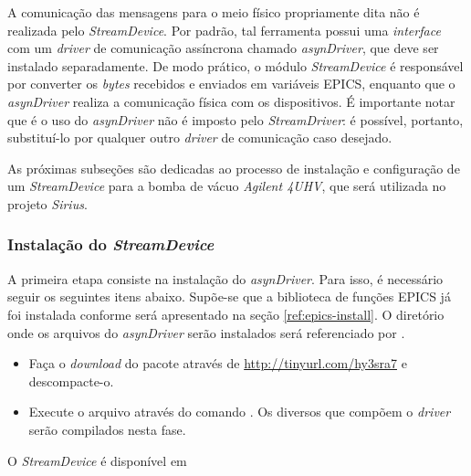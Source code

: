 \vspace{12pt}

A comunicação das mensagens para o meio físico propriamente dita não é realizada
pelo \textit{StreamDevice}. Por padrão, tal ferramenta possui uma
\textit{interface} com um \textit{driver} de comunicação assíncrona chamado
\textit{asynDriver}, que deve ser instalado separadamente. De modo prático, o
módulo \textit{StreamDevice} é responsável por converter os \textit{bytes}
recebidos e enviados em variáveis EPICS, enquanto que o \textit{asynDriver}
realiza a comunicação física com os dispositivos. É importante notar que é
o uso do \textit{asynDriver} não é imposto pelo \textit{StreamDriver}: é
possível, portanto, substituí-lo por qualquer outro \textit{driver} de
comunicação caso desejado.

\vspace{12pt}

As próximas subseções são dedicadas ao processo de instalação e configuração de
um \textit{StreamDevice} para a bomba de vácuo \textit{Agilent 4UHV}, que será
utilizada no projeto \textit{Sirius}.

\subsubsection{Instalação do \textit{StreamDevice}}

A primeira etapa consiste na instalação do \textit{asynDriver}. Para isso, é
necessário seguir os seguintes itens abaixo. Supõe-se que a biblioteca de
funções EPICS já foi instalada conforme será apresentado na seção
\ref{ref:epics-install}. O diretório onde os arquivos do \textit{asynDriver}
serão instalados será referenciado por .

\begin{itemize}
  \renewcommand\labelitemi{--}
  \item Faça o \textit{download} do pacote através de 
  \url{http://tinyurl.com/hy3sra7} e descompacte-o.
  \item Execute o arquivo  através do comando . Os
  diversos que compõem o \textit{driver} serão compilados nesta fase.
\end{itemize}

O \textit{StreamDevice} é disponível em
